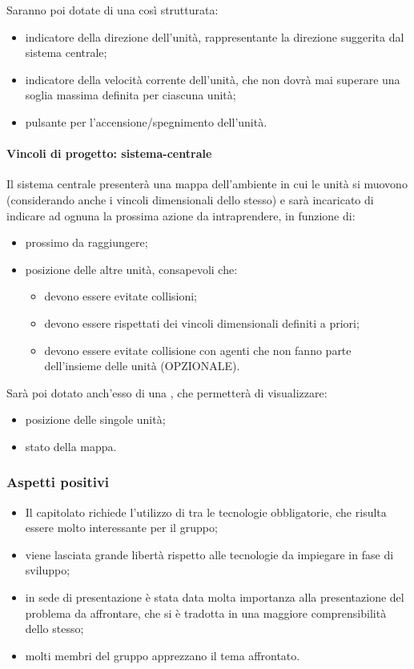 \documentclass[]{article}
\begin{document}
            \noindent
			Saranno poi dotate di una  così strutturata:
			\begin{itemize}
				\item indicatore della direzione dell'unità, rappresentante la direzione suggerita dal sistema centrale;
				\item indicatore della velocità corrente dell'unità, che non dovrà mai superare una soglia massima definita per ciascuna unità;
				\item pulsante per l'accensione/spegnimento dell'unità.
			\end{itemize}

			\paragraph{Vincoli di progetto: sistema-centrale}
			Il sistema centrale presenterà una mappa dell'ambiente in cui le unità si muovono (considerando anche i vincoli dimensionali dello stesso) e sarà incaricato di indicare ad ognuna la prossima azione da intraprendere, in funzione di:
			\begin{itemize}
				\item prossimo  da raggiungere;
				\item posizione delle altre unità, consapevoli che:
					\begin{itemize}
						\item devono essere evitate collisioni;
						\item devono essere rispettati dei vincoli dimensionali definiti a priori;
						\item devono essere evitate collisione con agenti che non fanno parte dell'insieme delle unità (OPZIONALE).
					\end{itemize}
			\end{itemize}

            \noindent
			Sarà poi dotato anch'esso di una , che permetterà di visualizzare:
			\begin{itemize}
				\item posizione  delle singole unità;
				\item stato  della mappa.
			\end{itemize}

			\subsubsection{Aspetti positivi}
			\begin{itemize}
				\item Il capitolato richiede l'utilizzo di  tra le tecnologie obbligatorie, che risulta essere molto interessante per il gruppo;
				\item viene lasciata grande libertà rispetto alle tecnologie da impiegare in fase di sviluppo;
				\item in sede di presentazione è stata data molta importanza alla presentazione del problema da affrontare, che si è tradotta in una maggiore comprensibilità dello stesso;
				\item molti membri del gruppo apprezzano il tema affrontato.
			\end{itemize}
\end{document}
